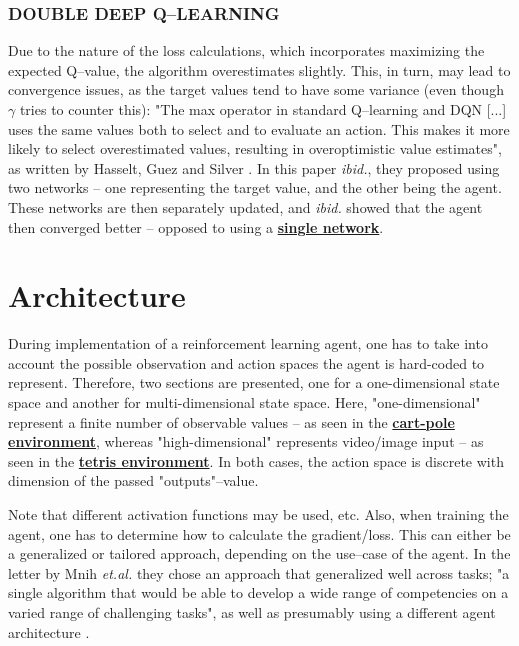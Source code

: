 \documentclass{article}
\let\oldhyperlink\hyperlink
\renewcommand{\hyperlink}[2]{\oldhyperlink{#1}{\textbf{#2}}}
\let\oldcite\cite
\renewcommand{\cite}[1]{\textbf{\oldcite{#1}}}
\renewenvironment{leftbar}[1][\hsize]{
    \def\FrameCommand{{\color{barcolor}\vrule width 0.5pt \hspace{10pt}}}
    \MakeFramed{\hsize#1 \advance\hsize-\width \FrameRestore}
}{\endMakeFramed}
\begin{document}
\begin{leftbar}
    \subsubsection*{DOUBLE DEEP Q–LEARNING}

    Due to the nature of the loss calculations, which incorporates maximizing the expected Q–value, the algorithm overestimates slightly. This, in turn, may lead to convergence issues, as the target values tend to have some variance (even though $\gamma$ tries to counter this): "The max operator in standard Q–learning and DQN [...] uses the same values both to select and to evaluate an action. This makes it more likely to select overestimated values, resulting in overoptimistic value estimates", as written by Hasselt, Guez and Silver \cite{Double-Q}. In this paper \textit{ibid.}, they proposed using two networks – one representing the target value, and the other being the agent. These networks are then separately updated, and \textit{ibid.} showed that the agent then converged better – opposed to using a \hyperlink{alg:dqn}{single network}. \cite{Double-Q}

\end{leftbar}

\section*{Architecture}

During implementation of a reinforcement learning agent, one has to take into account the possible observation and action spaces the agent is hard-coded to represent. Therefore, two sections are presented, one for a one-dimensional state space and another for multi-dimensional state space. Here, "one-dimensional" represent a finite number of observable values – as seen in the \hyperlink{seq:cart-pole}{cart-pole environment}, whereas "high-dimensional" represents video/image input – as seen in the \hyperlink{seq:tetris}{tetris environment}. In both cases, the action space is discrete with dimension of the passed "outputs"–value.

Note that different activation functions may be used, etc. Also, when training the agent, one has to determine how to calculate the gradient/loss. This can either be a generalized or tailored approach, depending on the use–case of the agent. In the letter by Mnih \textit{et.al.} they chose an approach that generalized well across tasks; "a single algorithm that would be able to develop a wide range of competencies on a varied range of challenging tasks", as well as presumably using a different agent architecture \cite{Human-level}.
\end{document}
